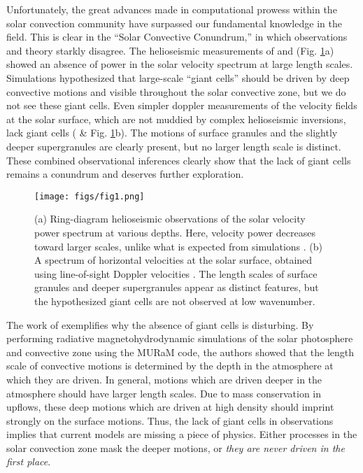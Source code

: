 \documentclass[aasms,12pt]{article}
\begin{document}
Unfortunately, the great advances made in computational prowess within the solar convection
community have surpassed our fundamental knowledge in the field. This is clear in the
``Solar Convective Conundrum,'' in which observations and theory starkly disagree.
The helioseismic measurements of \cite{hanasoge&all2012} and \cite{greer&all2015} (Fig. \ref{fig:fig1}a)
showed an absence of power in the solar velocity spectrum at large length scales.  Simulations
hypothesized that large-scale
``giant cells'' should be driven by deep convective motions and visible throughout the solar convective
zone, but we do not see these giant cells.
Even simpler doppler measurements of the velocity fields at the solar surface, which are not muddied
by complex helioseismic inversions, lack
giant cells (\citealt{hathaway&all2015} \& Fig. \ref{fig:fig1}b).  
The motions of surface granules and the slightly deeper supergranules are clearly present, but no
larger length scale is distinct.  These combined observational inferences clearly show that the lack of
giant cells remains a conundrum and deserves further exploration.

\begin{figure}[t]
\centering
\texttt{[image: figs/fig1.png]}
\caption{(a) Ring-diagram helioseismic observations of the solar velocity power spectrum at various depths.  
Here, velocity power decreases toward larger scales, unlike what is expected from simulations
\citep{greer&all2015}.  (b) A spectrum of horizontal
velocities at the solar surface, obtained using line-of-sight Doppler velocities \citep{hathaway&all2015}.
The length scales of surface granules and deeper supergranules appear as distinct features, but
the hypothesized giant cells are not observed at low wavenumber.
        \label{fig:fig1}}
\end{figure}

The work of \cite{lord&all2014} exemplifies why the absence of giant cells is disturbing.
By performing radiative magnetohydrodynamic simulations of the solar photosphere and convective zone using the
MURaM code, the authors
showed that the length scale of convective motions is determined by the depth in the atmosphere at 
which they are driven. In general, motions which are driven deeper in the atmosphere should have
larger length scales.
Due to mass conservation in upflows, these deep motions which are driven at high density should imprint
strongly on the surface motions. Thus,
the lack of giant cells in observations implies that current models are missing a piece of physics. 
Either processes in the solar convection zone mask the deeper motions, or \emph{they are never driven
in the first place}.
\end{document}
